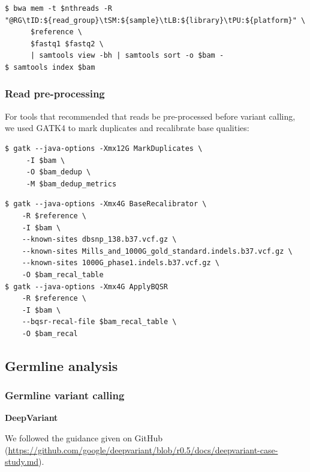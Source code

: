 \documentclass{article}
\begin{document}
\begin{lstlisting}
$ bwa mem -t $nthreads -R "@RG\tID:${read_group}\tSM:${sample}\tLB:${library}\tPU:${platform}" \
      $reference \
      $fastq1 $fastq2 \
      | samtools view -bh | samtools sort -o $bam -
$ samtools index $bam
\end{lstlisting}

\subsubsection*{Read pre-processing}

\noindent For tools that recommended that reads be pre-processed before variant calling, we used GATK4 to mark duplicates and recalibrate base qualities:

\begin{lstlisting}
$ gatk --java-options -Xmx12G MarkDuplicates \
     -I $bam \
     -O $bam_dedup \
     -M $bam_dedup_metrics
\end{lstlisting}

\begin{lstlisting}
$ gatk --java-options -Xmx4G BaseRecalibrator \
    -R $reference \
    -I $bam \
    --known-sites dbsnp_138.b37.vcf.gz \
    --known-sites Mills_and_1000G_gold_standard.indels.b37.vcf.gz \
    --known-sites 1000G_phase1.indels.b37.vcf.gz \
    -O $bam_recal_table
$ gatk --java-options -Xmx4G ApplyBQSR
    -R $reference \
    -I $bam \
    --bqsr-recal-file $bam_recal_table \
    -O $bam_recal
\end{lstlisting}

\subsection*{Germline analysis}

\subsubsection*{Germline variant calling}

\noindent \textbf{DeepVariant}

\noindent We followed the guidance given on GitHub (\url{https://github.com/google/deepvariant/blob/r0.5/docs/deepvariant-case-study.md}).
\end{document}
